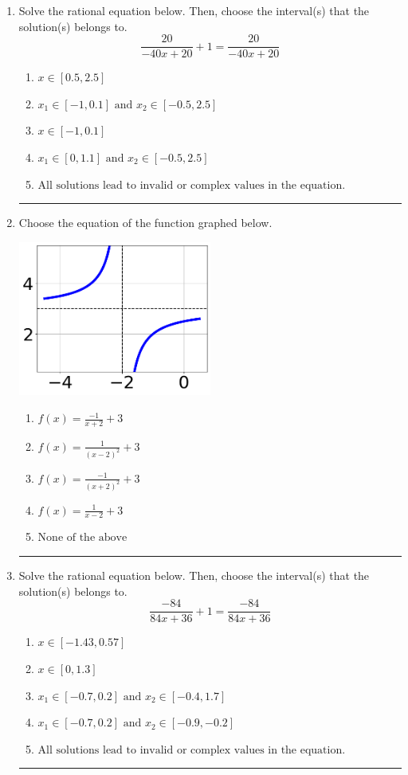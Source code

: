 \documentclass[14pt]{extbook}
\newcommand{\litem}[1]{\item#1\hspace*{-1cm}\rule{\textwidth}{0.4pt}}
\begin{document}
\begin{enumerate}
{\begin{enumerate}[label=\Alph*.]
\end{enumerate} }
\litem{
Solve the rational equation below. Then, choose the interval(s) that the solution(s) belongs to.\[ \frac{20}{-40x + 20} + 1 = \frac{20}{-40x + 20} \]\begin{enumerate}[label=\Alph*.]
\item \( x \in [0.5,2.5] \)
\item \( x_1 \in [-1, 0.1] \text{ and } x_2 \in [-0.5,2.5] \)
\item \( x \in [-1,0.1] \)
\item \( x_1 \in [0, 1.1] \text{ and } x_2 \in [-0.5,2.5] \)
\item \( \text{All solutions lead to invalid or complex values in the equation.} \)

\end{enumerate} }
\litem{
Choose the equation of the function graphed below.
\begin{center}
    \includegraphics[width=0.5\textwidth]{../Figures/rationalGraphToEquationCopyB.png}
\end{center}
\begin{enumerate}[label=\Alph*.]
\item \( f(x) = \frac{-1}{x + 2} + 3 \)
\item \( f(x) = \frac{1}{(x - 2)^2} + 3 \)
\item \( f(x) = \frac{-1}{(x + 2)^2} + 3 \)
\item \( f(x) = \frac{1}{x - 2} + 3 \)
\item \( \text{None of the above} \)

\end{enumerate} }
\litem{
Solve the rational equation below. Then, choose the interval(s) that the solution(s) belongs to.\[ \frac{-84}{84x + 36} + 1 = \frac{-84}{84x + 36} \]\begin{enumerate}[label=\Alph*.]
\item \( x \in [-1.43,0.57] \)
\item \( x \in [0,1.3] \)
\item \( x_1 \in [-0.7, 0.2] \text{ and } x_2 \in [-0.4,1.7] \)
\item \( x_1 \in [-0.7, 0.2] \text{ and } x_2 \in [-0.9,-0.2] \)
\item \( \text{All solutions lead to invalid or complex values in the equation.} \)


\end{enumerate}}
\end{enumerate}
\end{document}
